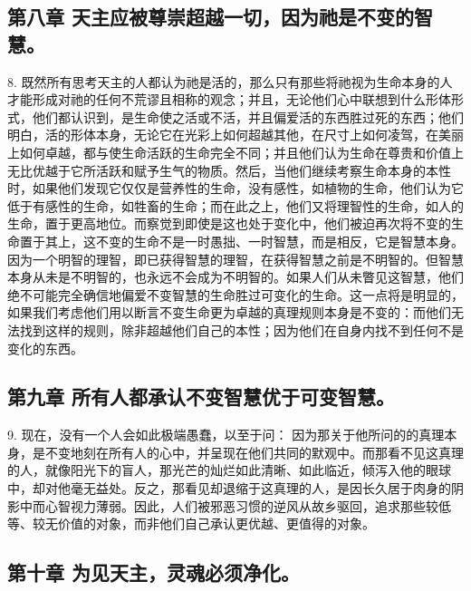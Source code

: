 \subsection{第八章  天主应被尊崇超越一切，因为祂是不变的智慧。}

8. 既然所有思考天主的人都认为祂是活的，那么只有那些将祂视为生命本身的人才能形成对祂的任何不荒谬且相称的观念；并且，无论他们心中联想到什么形体形式，他们都认识到，是生命使之活或不活，并且偏爱活的东西胜过死的东西；他们明白，活的形体本身，无论它在光彩上如何超越其他，在尺寸上如何凌驾，在美丽上如何卓越，都与使生命活跃的生命完全不同；并且他们认为生命在尊贵和价值上无比优越于它所活跃和赋予生气的物质。然后，当他们继续考察生命本身的本性时，如果他们发现它仅仅是营养性的生命，没有感性，如植物的生命，他们认为它低于有感性的生命，如牲畜的生命；而在此之上，他们又将理智性的生命，如人的生命，置于更高地位。而察觉到即使是这也处于变化中，他们被迫再次将不变的生命置于其上，这不变的生命不是一时愚拙、一时智慧，而是相反，它是智慧本身。因为一个明智的理智，即已获得智慧的理智，在获得智慧之前是不明智的。但智慧本身从未是不明智的，也永远不会成为不明智的。如果人们从未瞥见这智慧，他们绝不可能完全确信地偏爱不变智慧的生命胜过可变化的生命。这一点将是明显的，如果我们考虑他们用以断言不变生命更为卓越的真理规则本身是不变的：而他们无法找到这样的规则，除非超越他们自己的本性；因为他们在自身内找不到任何不是变化的东西。\par


\subsection{第九章  所有人都承认不变智慧优于可变智慧。}

9. 现在，没有一个人会如此极端愚蠢，以至于问： 因为那关于他所问的的真理本身，是不变地刻在所有人的心中，并呈现在他们共同的默观中。而那看不见这真理的人，就像阳光下的盲人，那光芒的灿烂如此清晰、如此临近，倾泻入他的眼球中，却对他毫无益处。反之，那看见却退缩于这真理的人，是因长久居于肉身的阴影中而心智视力薄弱。因此，人们被邪恶习惯的逆风从故乡驱回，追求那些较低等、较无价值的对象，而非他们自己承认更优越、更值得的对象。\par


\subsection{第十章 为见天主，灵魂必须净化。}

